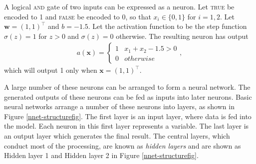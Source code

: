 
\begin{example}
\label{nnets-and-eg}
A logical \textsc{and} gate of two inputs can be expressed as a neuron. Let \textsc{true} be encoded to 1 and \textsc{false} be encoded to 0, so that $x_i \in \{0,1\}$ for $i=1,2$. Let $\mathbf{w} = (1, 1)^\intercal$ and $b = -1.5$. Let the activation function to be the step function $\sigma(z) = 1$ for $z > 0$ and $\sigma(z) = 0$ otherwise. The resulting neuron has output
\begin{align}
	a(\mathbf{x}) = \begin{cases}
		1 & x_1 + x_2 - 1.5 > 0\\
		0 & otherwise
	\end{cases},
\end{align}
which will output 1 only when $\mathbf{x} = (1, 1)^\intercal$.
\end{example}


A large number of these neurons can be arranged to form a neural network. The generated outputs of these neurons can be fed as inputs into later neurons. Basic neural networks arrange a number of these neurons into layers, as shown in Figure \ref{nnet-structurefig}. The first layer is an input layer, where data is fed into the model. Each neuron in this first layer represents a variable. The last layer is an output layer which generates the final result. The central layers, which conduct most of the processing, are known as \textit{hidden layers} and are shown as Hidden layer 1 and Hidden layer 2 in Figure \ref{nnet-structurefig}.

